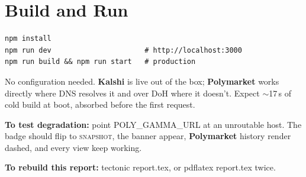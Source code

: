\documentclass[11pt,a4paper]{article}
\newcommand{\code}[1]{{\ttfamily\small #1}}
\newcommand{\PM}{{\color{poly}\textbf{Polymarket}}}
\newcommand{\KS}{{\color{kalshi}\textbf{Kalshi}}}
\begin{document}
\section{Build and Run}

\begin{lstlisting}
npm install
npm run dev                      # http://localhost:3000
npm run build && npm run start   # production
\end{lstlisting}

No configuration needed. \KS{} is live out of the box; \PM{} works directly where DNS resolves
it and over DoH where it doesn't. Expect $\sim$17\,s of cold build at boot, absorbed before the
first request.

\textbf{To test degradation:} point \code{POLY\_GAMMA\_URL} at an unroutable host. The badge
should flip to \textsc{snapshot}, the banner appear, \PM{} history render dashed, and every
view keep working.

\textbf{To rebuild this report:} \code{tectonic report.tex}, or \code{pdflatex report.tex}
twice.
\end{document}

